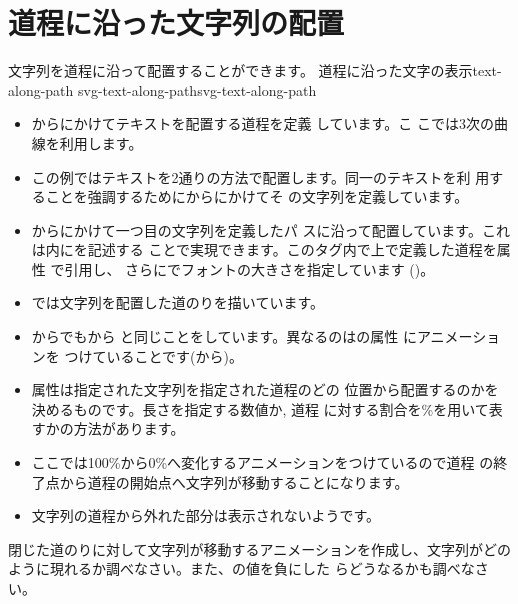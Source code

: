 \section{道程に沿った文字列の配置}
文字列を道程に沿って配置することができます。
    {道程に沿った文字の表示}{text-along-path}
{}
{svg-text-along-path}{svg-text-along-path}
\begin{itemize}
 \item {}からにかけてテキストを配置する道程を定義
       しています。こ
       こでは3次の\Bezier 曲線を利用します。
 \item この例ではテキストを2通りの方法で配置します。同一のテキストを利
       用することを強調するためにからにかけてそ
       の文字列を定義しています。
 \item {}からにかけて一つ目の文字列を定義したパ
       スに沿って配置しています。これは内にを記述する
       ことで実現できます。このタグ内で上で定義した道程を属性
       で引用し、
       さらにでフォントの大きさを指定しています
       ()。
 \item {}では文字列を配置した道のりを描いています。
 \item {}からでもから
       と同じことをしています。異なるのはの属性
       にアニメーションを
       つけていることです(から)。
 \item 属性は指定された文字列を指定された道程のどの
       位置から配置するのかを決めるものです。長さを指定する数値か, 道程
       に対する割合を\%を用いて表すかの方法があります。
 \item ここでは100\%から0\%へ変化するアニメーションをつけているので道程
       の終了点から道程の開始点へ文字列が移動することになります。
 \item 文字列の道程から外れた部分は表示されないようです。
\end{itemize}
\begin{Problem}
閉じた道のりに対して文字列が移動するアニメーションを作成し、文字列がどの
 ように現れるか調べなさい。また、の値を負にした
 らどうなるかも調べなさい。
\end{Problem}
